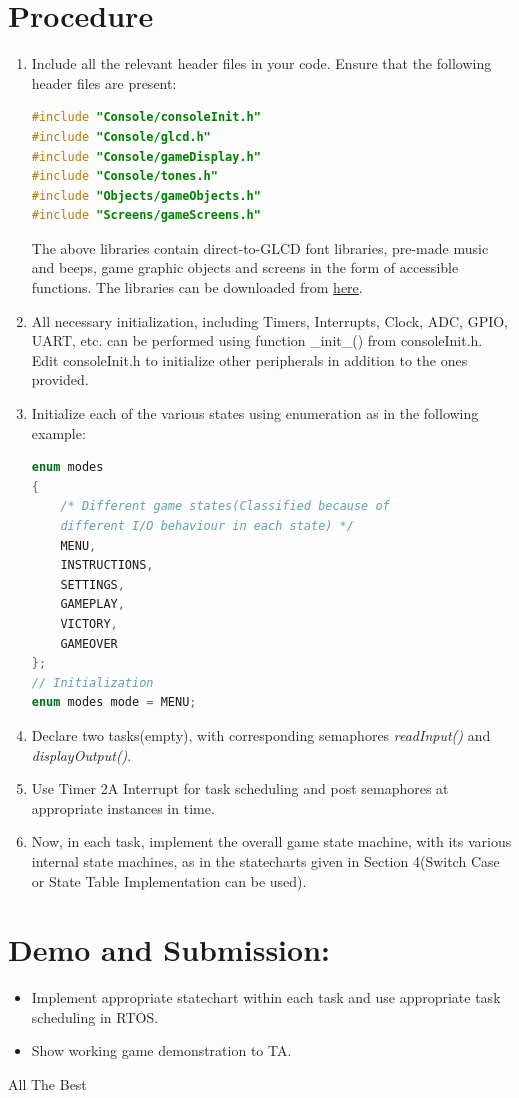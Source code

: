 \documentclass{article}
\begin{document}
\section{Procedure}
\begin{enumerate}
\item \qquad Include all the relevant header files in your code. Ensure that the following header
files are present:
\begin{lstlisting}[basicstyle = \small, language = C]
#include "Console/consoleInit.h"
#include "Console/glcd.h"
#include "Console/gameDisplay.h"
#include "Console/tones.h"
#include "Objects/gameObjects.h"
#include "Screens/gameScreens.h"
\end{lstlisting}
\qquad The above libraries contain direct-to-GLCD font libraries, pre-made music and beeps, game graphic objects and screens in the form of accessible functions. The libraries can be downloaded from \href{https://github.com/eYSIP-2017/eYSIP-2017_Game_Development-TI-RTOS/blob/master/Documentation/Breakout/Console\%20Libraries.zip}{here}.
\item All necessary initialization, including Timers, Interrupts, Clock, ADC, GPIO, UART, etc. can be performed using function \_init\_() from consoleInit.h. Edit consoleInit.h to initialize other peripherals in addition to the ones provided.
\item Initialize each of the various states using enumeration as in the following example:
\begin{lstlisting}[basicstyle = \small, language = C]
enum modes
{
    /* Different game states(Classified because of 
    different I/O behaviour in each state) */
    MENU,
    INSTRUCTIONS,
    SETTINGS,
    GAMEPLAY,
    VICTORY,
    GAMEOVER
};
// Initialization
enum modes mode = MENU;
\end{lstlisting}
\item Declare two tasks(empty), with corresponding semaphores \textit{readInput()} and \textit{displayOutput()}.
\item Use Timer 2A Interrupt for task scheduling and post semaphores at appropriate instances in time.
\item Now, in each task, implement the overall game state machine, with its various internal state machines, as in the statecharts given in Section 4(Switch Case or State Table Implementation can be used).
\end{enumerate}
\section{Demo and Submission:}
\begin{itemize}
    \item Implement appropriate statechart within each task and use appropriate task scheduling in RTOS.
    \item Show working game demonstration to TA.
\end{itemize}
\begin{center}
\newline
   All The Best

 \end{center}
\end{document}
